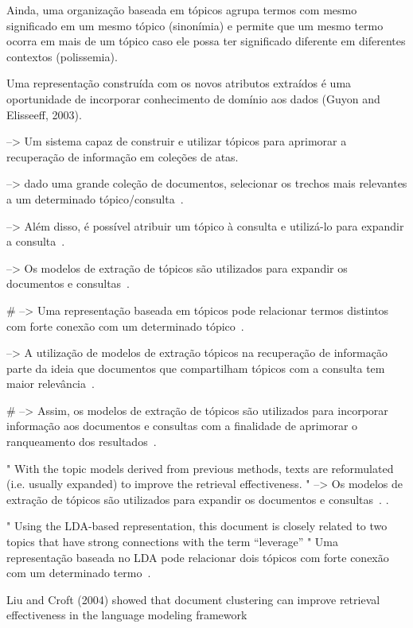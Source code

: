Ainda, uma organização baseada em tópicos agrupa termos com mesmo significado em um mesmo tópico (sinonímia) e permite que um mesmo termo ocorra em mais de um tópico caso ele possa ter significado diferente em diferentes contextos (polissemia). 


Uma representação construída com os novos atributos extraídos é uma oportunidade de incorporar conhecimento de domínio aos dados (Guyon and Elisseeff, 2003).




--> { Um sistema capaz de construir e utilizar tópicos para aprimorar a recuperação de informação em coleções de atas. }

--> { dado uma grande coleção de documentos, selecionar os trechos mais relevantes a um determinado tópico/consulta~\cite{Zhai2017}. }

--> Além disso, é possível atribuir um tópico à consulta e utilizá-lo para expandir a consulta~\cite{Xing2009}. 

--> Os modelos de extração de tópicos são utilizados para expandir os documentos e consultas~\cite{WEI2007}.

# --> Uma representação baseada em tópicos pode relacionar termos distintos com forte conexão com um determinado tópico~\cite{Wei2006}.

--> A utilização de modelos de extração tópicos na recuperação de informação parte da ideia que documentos que compartilham tópicos com a consulta tem maior relevância~\cite{Xing2009}. 

# --> Assim, os modelos de extração de tópicos são utilizados para incorporar informação aos documentos e consultas com a finalidade de aprimorar o ranqueamento dos resultados~\cite{WEI2007}.


" With the topic models derived from previous methods, texts are reformulated (i.e. usually expanded) to improve the retrieval effectiveness. "  
--> Os modelos de extração de tópicos são utilizados para expandir os documentos e consultas~\cite{WEI2007}.
.



" Using the LDA-based representation, this document is closely related to two topics that have strong connections with the term “leverage” "
Uma representação baseada no LDA pode relacionar dois tópicos com forte conexão com um determinado termo~\cite{Wei2006}.




Liu and Croft (2004) showed that document clustering can improve retrieval effectiveness in the language modeling framework


